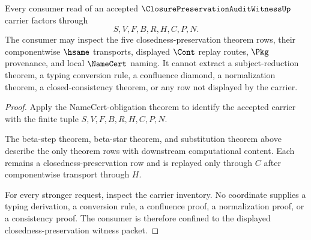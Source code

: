 \begin{theorem}
\label{thm:closure-preservation-audit-witness-nonescape}
Every consumer read of an accepted $\ClosurePreservationAuditWitnessUp$ carrier factors through
$$
S,V,F,B,R,H,C,P,N.
$$
The consumer may inspect the five closedness-preservation theorem rows, their componentwise $\hsame$ transports, displayed $\Cont$ replay routes, $\Pkg$ provenance, and local $\NameCert$ naming. It cannot extract a subject-reduction theorem, a typing conversion rule, a confluence diamond, a normalization theorem, a closed-consistency theorem, or any row not displayed by the carrier.
\end{theorem}
\begin{proof}
Apply the NameCert-obligation theorem to identify the accepted carrier with the finite tuple $S,V,F,B,R,H,C,P,N$.

The beta-step theorem, beta-star theorem, and substitution theorem above describe the only theorem rows with downstream computational content. Each remains a closedness-preservation row and is replayed only through $C$ after componentwise transport through $H$.

For every stronger request, inspect the carrier inventory. No coordinate supplies a typing derivation, a conversion rule, a confluence proof, a normalization proof, or a consistency proof. The consumer is therefore confined to the displayed closedness-preservation witness packet.
\end{proof}


\begin{closurestatus}{\ClosurePreservationAuditWitnessUp}
  \theoryclosure{\seedClosure}
  \formalstatus{\unformalizedV}
\end{closurestatus}
